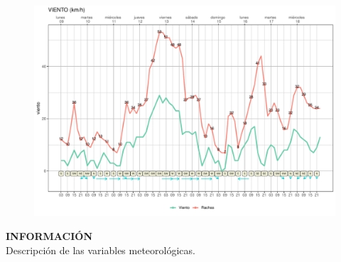 \documentclass[[a4paper,landscape]{article}\usepackage[]{graphicx}\usepackage[]{color}
\makeatletter
\def\maxwidth{ %
  \ifdim\Gin@nat@width>\linewidth
    \linewidth
  \else
    \Gin@nat@width
  \fi
}
\newenvironment{knitrout}{}{} %
\makeatother
\begin{document}
\begin{figure}
\begin{knitrout}
\color{fgcolor}
\includegraphics[width=\maxwidth]{figure/Figdir2-1} 

\end{knitrout}
\end{figure}

\clearpage
\newpage

\textbf{\textcolor{meteoblue}{INFORMACI\'ON}}\\

Descripción de las variables meteorol\'ogicas.
\end{document}
